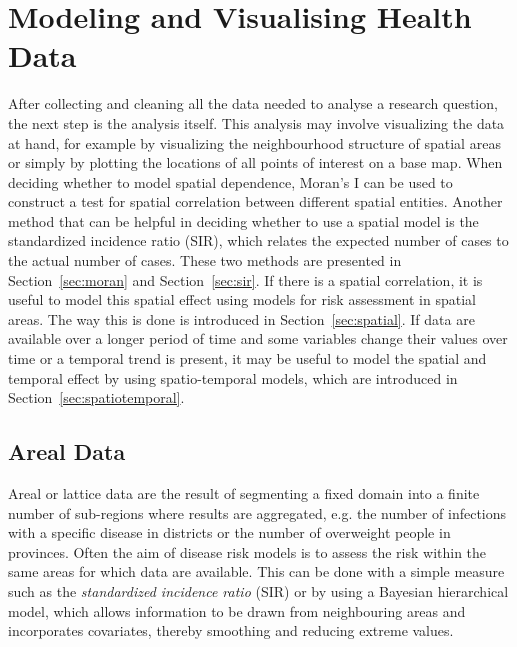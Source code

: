 \section{Modeling and Visualising Health Data}
After collecting and cleaning all the data needed to analyse a research question, the next step is the analysis itself. This analysis may involve visualizing the data at hand, for example by visualizing the neighbourhood structure of spatial areas or simply by plotting the locations of all points of interest on a base map. When deciding whether to model spatial dependence, Moran's I can be used to construct a test for spatial correlation between different spatial entities. Another method that can be helpful in deciding whether to use a spatial model is the standardized incidence ratio (SIR), which relates the expected number of cases to the actual number of cases. These two methods are presented in Section~\ref{sec:moran} and Section~\ref{sec:sir}. If there is a spatial correlation, it is useful to model this spatial effect using models for risk assessment in spatial areas. The way this is done is introduced in Section~\ref{sec:spatial}. If data are available over a longer period of time and some variables change their values over time or a temporal trend is present, it may be useful to model the spatial and temporal effect by using spatio-temporal models, which are introduced in Section~\ref{sec:spatiotemporal}.
\subsection{Areal Data}
Areal or lattice data are the result of segmenting a fixed domain into a finite number of sub-regions where results are aggregated, e.g. the number of infections with a specific disease in districts or the number of overweight people in provinces. Often the aim of disease risk models is to assess the risk within the same areas for which data are available. This can be done with a simple measure such as the \textit{standardized incidence ratio} (SIR) or by using a Bayesian hierarchical model, which allows information to be drawn from neighbouring areas and incorporates covariates, thereby smoothing and reducing extreme values. 
